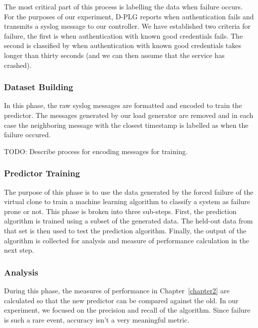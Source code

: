 The most critical part of this process is labelling the data when failure
occurs.  For the purposes of our experiment, D-PLG reports when authentication
fails and transmits a syslog message to our controller.  We have established
two criteria for failure, the first is when authentication with known good
credentials fails.  The second is classified by when authentication with known
good credentials takes longer than thirty seconds (and we can then assume that
the service has crashed).

\subsubsection{Dataset Building}
In this phase, the raw syslog messages are formatted and encoded to train the
predictor.  The messages generated by our load generator are removed and in
each case the neighboring message with the closest timestamp is labelled as
when the failure occured.

TODO:  Describe process for encoding messages for training.

\subsubsection{Predictor Training}
The purpose of this phase is to use the data generated by the forced failure of
the virtual clone to train a machine learning algorithm to classify a system as
failure prone or not.  This phase is broken into three sub-steps.  First, the
prediction algorithm is trained using a subset of the generated data.  The
held-out data from that set is then used to test the prediction algorithm.
Finally, the output of the algorithm is collected for analysis and measure of
performance calculation in the next step.

\subsubsection{Analysis}
During this phase, the measures of performance in Chapter~\ref{chapter2} are
calculated so that the new predictor can be compared against the old.  In our
experiment, we focused on the precision and recall of the algorithm.  Since
failure is such a rare event, accuracy isn't a very meaningful metric.


